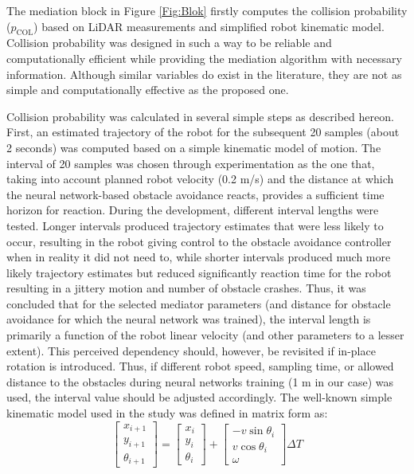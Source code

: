  The mediation block in Figure \ref{Fig:Blok} firstly computes the collision probability ($p_{\textrm{COL}}$) based on LiDAR measurements and simplified robot kinematic model. Collision probability was designed in such a way to be reliable and computationally efficient while providing the mediation algorithm with necessary information. Although similar variables do exist in the literature, they are not as simple and computationally effective \cite{Coenen2014} as the proposed one.

Collision probability was calculated in several simple steps as described hereon. First, an estimated trajectory of the robot for the subsequent 20 samples (about 2 seconds) was computed based on a simple kinematic model of motion. The interval of 20 samples was chosen through experimentation as the one that, taking into account planned robot velocity (0.2 m/s) and the distance at which the neural network-based obstacle avoidance reacts, provides a sufficient time horizon for reaction. During the development, different interval lengths were tested. Longer intervals produced trajectory estimates that were less likely to occur, resulting in the robot giving control to the obstacle avoidance controller when in reality it did not need to, while shorter intervals produced much more likely trajectory estimates but reduced significantly reaction time for the robot resulting in a jittery motion and number of obstacle crashes. Thus, it was concluded that for the selected mediator parameters (and distance for obstacle avoidance for which the neural network was trained), the interval length is primarily a function of the robot linear velocity (and other parameters to a lesser extent). This perceived dependency should, however, be revisited if in-place rotation is introduced. Thus, if different robot speed, sampling time, or allowed distance to the obstacles during neural networks training (1 m in our case) was used, the interval value should be adjusted accordingly. The well-known simple kinematic model used in the study was defined in matrix form as:
\begin{equation}
    \begin{bmatrix}
        x_{i+1}\\
        y_{i+1}\\
        \theta_{i+1}
    \end{bmatrix} = 
    \begin{bmatrix}
        x_{i}\\
        y_{i}\\
        \theta_{i}
    \end{bmatrix} + 
    \begin{bmatrix}
        -v \sin{\theta_{i}}\\
        v \cos{\theta_{i}}\\
        \omega
    \end{bmatrix}\Delta T
\end{equation}
